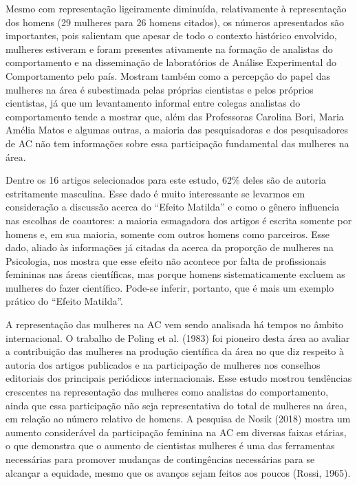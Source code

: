 Mesmo com representação ligeiramente diminuída, relativamente à representação dos homens (29 mulheres para 26 homens citados), os números apresentados são importantes, pois salientam que apesar de todo o contexto histórico envolvido, mulheres estiveram e foram presentes ativamente na formação de analistas do comportamento e na disseminação de laboratórios de Análise Experimental do Comportamento pelo país. Mostram também como a percepção do papel das mulheres na área é subestimada pelas próprias cientistas e pelos próprios cientistas, já que um levantamento informal entre colegas analistas do comportamento tende a mostrar que, além das Professoras Carolina Bori, Maria Amélia Matos e algumas outras, a maioria das pesquisadoras e dos pesquisadores de AC não tem informações sobre essa participação fundamental das mulheres na área.

Dentre os 16 artigos selecionados para este estudo, 62\% deles são de autoria estritamente masculina. Esse dado é muito interessante se levarmos em consideração a discussão acerca do ``Efeito Matilda'' e como o gênero influencia nas escolhas de coautores: a maioria esmagadora dos artigos é escrita somente por homens e, em sua maioria, somente com outros homens como parceiros. Esse dado, aliado às informações já citadas da acerca da proporção de mulheres na Psicologia, nos mostra que esse efeito não acontece por falta de profissionais femininas nas áreas científicas, mas porque homens sistematicamente excluem as mulheres do fazer científico. Pode-se inferir, portanto, que é mais um exemplo prático do ``Efeito Matilda''.

A representação das mulheres na AC vem sendo analisada há tempos no âmbito internacional. O trabalho de Poling et al. (1983) foi pioneiro desta área ao avaliar a contribuição das mulheres na produção científica da área no que diz respeito à autoria dos artigos publicados e na participação de mulheres nos conselhos editoriais dos principais periódicos internacionais. Esse estudo mostrou tendências crescentes na representação das mulheres como analistas do comportamento, ainda que essa participação não seja representativa do total de mulheres na área, em relação ao número relativo de homens. A pesquisa de Nosik (2018) mostra um aumento considerável da participação feminina na AC em diversas faixas etárias, o que demonstra que o aumento de cientistas mulheres é uma das ferramentas necessárias para promover mudanças de contingências necessárias para se alcançar a equidade, mesmo que os avanços sejam feitos aos poucos (Rossi, 1965).

